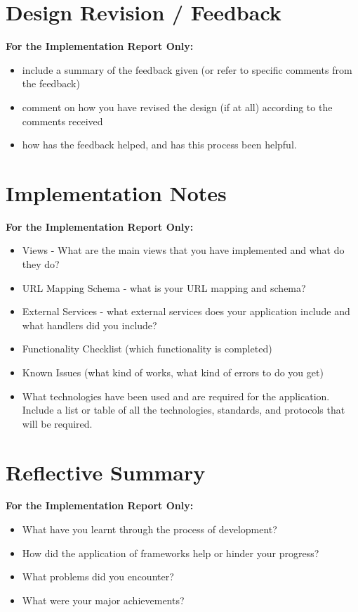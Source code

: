 \documentclass{sig-alt-release2}
\begin{document}
\section{Design Revision / Feedback}
{\bf For the Implementation Report Only:}
\begin{itemize}
\item	include a summary of the feedback given (or refer to specific comments from the feedback) 
\item	comment on how you have revised the design (if at all) according to the comments received 
\item	how has the feedback helped, and has this process been helpful.
\end{itemize}

\section{Implementation Notes}
{\bf For the Implementation Report Only:}

\begin{itemize}
\item Views - What are the main views that you have implemented and what do they do?
\item URL Mapping Schema - what is your URL mapping and schema?
\item External Services  - what external services does your application include and what handlers did you include?
\item	Functionality Checklist (which functionality is completed)
\item	Known Issues (what kind of works, what kind of errors to do you get)
\item What technologies have been used and are required for the application. Include a list or table of all the technologies, standards, and protocols that will be required.
\end{itemize}

\section{Reflective Summary}
{\bf For the Implementation Report Only:}
\begin{itemize}
\item	What have you learnt through the process of development? 
\item	How did the application of frameworks help or hinder your progress? 
\item	What problems did you encounter? 
\item	What were your major achievements?
\end{itemize}
\end{document}
